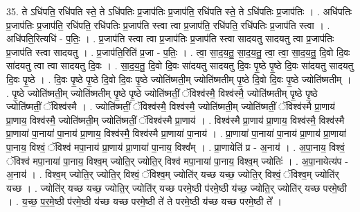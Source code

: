 \documentclass[17pt]{extarticle}
\begin{document}
35. ते ऽधि॑पति॒ रधि॑पति स्ते॒ ते ऽधि॑पतिः प्र॒जाप॑तिः प्र॒जाप॑ति॒ रधि॑पति स्ते॒ ते ऽधि॑पतिः प्र॒जाप॑तिः । . अधि॑पतिः प्र॒जाप॑तिः प्र॒जाप॑ति॒ रधि॑पति॒ रधि॑पतिः प्र॒जाप॑ति स्त्वा त्वा प्र॒जाप॑ति॒ रधि॑पति॒ रधि॑पतिः प्र॒जाप॑ति स्त्वा । . अधि॑पति॒रित्यधि॑ - प॒तिः॒ । . प्र॒जाप॑ति स्त्वा त्वा प्र॒जाप॑तिः प्र॒जाप॑ति स्त्वा सादयतु सादयतु त्वा प्र॒जाप॑तिः प्र॒जाप॑ति स्त्वा सादयतु । . प्र॒जाप॑ति॒रिति॑ प्र॒जा - प॒तिः॒ । . त्वा॒ सा॒द॒य॒तु॒ सा॒द॒य॒तु॒ त्वा॒ त्वा॒ सा॒द॒य॒तु॒ दि॒वो दि॒वः सा॑दयतु त्वा त्वा सादयतु दि॒वः । . सा॒द॒य॒तु॒ दि॒वो दि॒वः सा॑दयतु सादयतु दि॒वः पृ॒ष्ठे पृ॒ष्ठे दि॒वः सा॑दयतु सादयतु दि॒वः पृ॒ष्ठे । . दि॒वः पृ॒ष्ठे पृ॒ष्ठे दि॒वो दि॒वः पृ॒ष्ठे ज्योति॑ष्मती॒म् ज्योति॑ष्मतीम् पृ॒ष्ठे दि॒वो दि॒वः पृ॒ष्ठे ज्योति॑ष्मतीम् । . पृ॒ष्ठे ज्योति॑ष्मती॒म् ज्योति॑ष्मतीम् पृ॒ष्ठे पृ॒ष्ठे ज्योति॑ष्मतीं॒ ॅविश्व॑स्मै॒ विश्व॑स्मै॒ ज्योति॑ष्मतीम् पृ॒ष्ठे पृ॒ष्ठे ज्योति॑ष्मतीं॒ ॅविश्व॑स्मै । . ज्योति॑ष्मतीं॒ ॅविश्व॑स्मै॒ विश्व॑स्मै॒ ज्योति॑ष्मती॒म् ज्योति॑ष्मतीं॒ ॅविश्व॑स्मै प्रा॒णाय॑ प्रा॒णाय॒ विश्व॑स्मै॒ ज्योति॑ष्मती॒म् ज्योति॑ष्मतीं॒ ॅविश्व॑स्मै प्रा॒णाय॑ । . विश्व॑स्मै प्रा॒णाय॑ प्रा॒णाय॒ विश्व॑स्मै॒ विश्व॑स्मै प्रा॒णाया॑ पा॒नाया॑ पा॒नाय॑ प्रा॒णाय॒ विश्व॑स्मै॒ विश्व॑स्मै प्रा॒णाया॑ पा॒नाय॑ । . प्रा॒णाया॑ पा॒नाया॑ पा॒नाय॑ प्रा॒णाय॑ प्रा॒णाया॑ पा॒नाय॒ विश्वं॒ ॅविश्व॑ मपा॒नाय॑ प्रा॒णाय॑ प्रा॒णाया॑ पा॒नाय॒ विश्व᳚म् । . प्रा॒णायेति॑ प्र - अ॒नाय॑ । . अ॒पा॒नाय॒ विश्वं॒ ॅविश्व॑ मपा॒नाया॑ पा॒नाय॒ विश्व॒म् ज्योति॒र् ज्योति॒र् विश्व॑ मपा॒नाया॑ पा॒नाय॒ विश्व॒म् ज्योतिः॑ । . अ॒पा॒नायेत्य॑प - अ॒नाय॑ । . विश्व॒म् ज्योति॒र् ज्योति॒र् विश्वं॒ ॅविश्व॒म् ज्योति॑र् यच्छ यच्छ॒ ज्योति॒र् विश्वं॒ ॅविश्व॒म् ज्योति॑र् यच्छ । . ज्योति॑र् यच्छ यच्छ॒ ज्योति॒र् ज्योति॑र् यच्छ परमे॒ष्ठी प॑रमे॒ष्ठी य॑च्छ॒ ज्योति॒र् ज्योति॑र् यच्छ परमे॒ष्ठी । . य॒च्छ॒ प॒र॒मे॒ष्ठी प॑रमे॒ष्ठी य॑च्छ यच्छ परमे॒ष्ठी ते॑ ते परमे॒ष्ठी य॑च्छ यच्छ परमे॒ष्ठी ते᳚ । \newline
\end{document}
